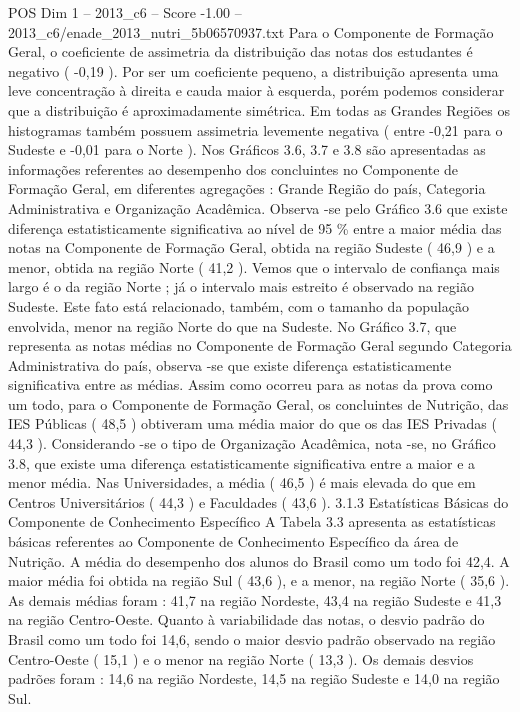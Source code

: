 \begin{textsample}{POS Dim 1 – 2013\_c6 – Score -1.00 – 2013\_c6/enade\_2013\_nutri\_5b06570937.txt}
Para o Componente de Formação Geral, o coeficiente de assimetria da distribuição das notas dos estudantes é negativo ( -0,19 ).
Por ser um coeficiente pequeno, a distribuição apresenta uma leve concentração à direita e cauda maior à esquerda, porém podemos considerar que a distribuição é aproximadamente simétrica.
Em todas as Grandes Regiões os histogramas também possuem assimetria levemente negativa ( entre -0,21 para o Sudeste e -0,01 para o Norte ).
Nos Gráficos 3.6, 3.7 e 3.8 são apresentadas as informações referentes ao desempenho dos concluintes no Componente de Formação Geral, em diferentes agregações : Grande Região do país, Categoria Administrativa e Organização Acadêmica.
Observa -se pelo Gráfico 3.6 que existe diferença estatisticamente significativa ao nível de 95 \% entre a maior média das notas na Componente de Formação Geral, obtida na região Sudeste ( 46,9 ) e a menor, obtida na região Norte ( 41,2 ).
Vemos que o intervalo de confiança mais largo é o da região Norte ; já o intervalo mais estreito é observado na região Sudeste.
Este fato está relacionado, também, com o tamanho da população envolvida, menor na região Norte do que na Sudeste.
No Gráfico 3.7, que representa as notas médias no Componente de Formação Geral segundo Categoria Administrativa do país, observa -se que existe diferença estatisticamente significativa entre as médias.
Assim como ocorreu para as notas da prova como um todo, para o Componente de Formação Geral, os concluintes de Nutrição, das IES Públicas ( 48,5 ) obtiveram uma média maior do que os das IES Privadas ( 44,3 ).
Considerando -se o tipo de Organização Acadêmica, nota -se, no Gráfico 3.8, que existe uma diferença estatisticamente significativa entre a maior e a menor média.
Nas Universidades, a média ( 46,5 ) é mais elevada do que em Centros Universitários ( 44,3 ) e Faculdades ( 43,6 ). 3.1.3 Estatísticas Básicas do Componente de Conhecimento Específico A Tabela 3.3 apresenta as estatísticas básicas referentes ao Componente de Conhecimento Específico da área de Nutrição.
A média do desempenho dos alunos do Brasil como um todo foi 42,4.
A maior média foi obtida na região Sul ( 43,6 ), e a menor, na região Norte ( 35,6 ).
As demais médias foram : 41,7 na região Nordeste, 43,4 na região Sudeste e 41,3 na região Centro-Oeste.
Quanto à variabilidade das notas, o desvio padrão do Brasil como um todo foi 14,6, sendo o maior desvio padrão observado na região Centro-Oeste ( 15,1 ) e o menor na região Norte ( 13,3 ).
Os demais desvios padrões foram : 14,6 na região Nordeste, 14,5 na região Sudeste e 14,0 na região Sul.

\end{textsample}
